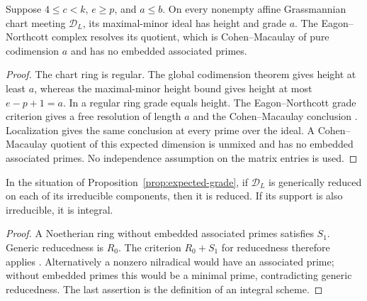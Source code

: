 \begin{proposition}
\label{prop:expected-grade}
Suppose $4\le c<k$, $e\ge p$, and $a\le b$. On every nonempty affine
Grassmannian chart meeting $\mathscr D_L$, its maximal-minor ideal has
height and grade $a$. The Eagon--Northcott complex resolves its quotient,
which is Cohen--Macaulay of pure codimension $a$ and has no embedded
associated primes.
\end{proposition}
\begin{proof}
The chart ring is regular. The global codimension theorem gives height
at least $a$, whereas the maximal-minor height bound gives height at most
$e-p+1=a$. In a regular ring grade equals height. The Eagon--Northcott
grade criterion gives a free resolution of length $a$ and the
Cohen--Macaulay conclusion \cite{EN,Kustin}. Localization gives the same
conclusion at every prime over the ideal. A Cohen--Macaulay quotient of
this expected dimension is unmixed and has no embedded associated
primes. No independence assumption on the matrix entries is used.
\end{proof}
\begin{proposition}\label{prop:generic-reducedness}
In the situation of Proposition~\ref{prop:expected-grade}, if
$\mathscr D_L$ is generically reduced on each of its irreducible
components, then it is reduced. If its support is also irreducible, it
is integral.
\end{proposition}
\begin{proof}
A Noetherian ring without embedded associated primes satisfies $S_1$.
Generic reducedness is $R_0$. The criterion $R_0+S_1$ for reducedness
therefore applies \cite[Tag 031O]{Stacks}.
Alternatively a nonzero nilradical would have an associated prime;
without embedded primes this would be a minimal prime, contradicting
generic reducedness. The last assertion is the definition of an
integral scheme.
\end{proof}
